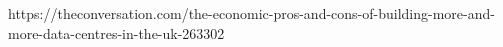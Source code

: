 https://theconversation.com/the-economic-pros-and-cons-of-building-more-and-more-data-centres-in-the-uk-263302